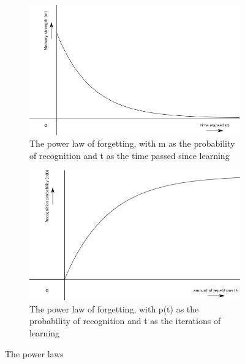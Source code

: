 \begin{figure}
    \centering
    \begin{subfigure}{0.7\textwidth}
        \includegraphics[width=\textwidth]{img/powerlawforgetting}
        \caption{The power law of forgetting, with m as the probability of recognition and t as the time passed since learning}
        \label{fig:powerlawforgetting}
    \end{subfigure}
    \par\bigskip
    \begin{subfigure}{0.7\textwidth}
        \includegraphics[width=\textwidth]{img/powerlawlearning}
        \caption{The power law of forgetting, with p(t) as the probability of recognition and t as the iterations of learning}
        \label{fig:powerlawlearning}
    \end{subfigure}
    \caption{The power laws}
\end{figure}

